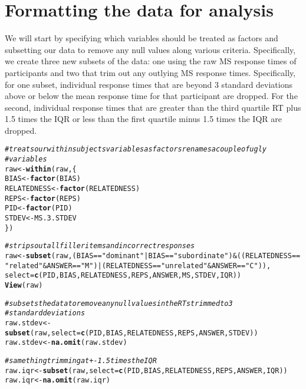 \documentclass[11pt,final] {article}\usepackage[]{graphicx}\usepackage[]{color}
\makeatletter
\newcommand{\hlstr}[1]{\textcolor[rgb]{0.192,0.494,0.8}{#1}}%
\newcommand{\hlcom}[1]{\textcolor[rgb]{0.678,0.584,0.686}{\textit{#1}}}%
\newcommand{\hlopt}[1]{\textcolor[rgb]{0,0,0}{#1}}%
\newcommand{\hlstd}[1]{\textcolor[rgb]{0.345,0.345,0.345}{#1}}%
\newcommand{\hlkwb}[1]{\textcolor[rgb]{0.69,0.353,0.396}{#1}}%
\newcommand{\hlkwc}[1]{\textcolor[rgb]{0.333,0.667,0.333}{#1}}%
\newcommand{\hlkwd}[1]{\textcolor[rgb]{0.737,0.353,0.396}{\textbf{#1}}}%
\newenvironment{kframe}{%
 \def\at@end@of@kframe{}%
 \ifinner\ifhmode%
  \def\at@end@of@kframe{\end{minipage}}%
  \begin{minipage}{\columnwidth}%
 \fi\fi%
 \def\FrameCommand##1{\hskip\@totalleftmargin \hskip-\fboxsep
 \colorbox{shadecolor}{##1}\hskip-\fboxsep
     \hskip-\linewidth \hskip-\@totalleftmargin \hskip\columnwidth}%
 \MakeFramed {\advance\hsize-\width
   \@totalleftmargin\z@ \linewidth\hsize
   \@setminipage}}%
 {\par\unskip\endMakeFramed%
 \at@end@of@kframe}
\newenvironment{knitrout}{}{} %
\makeatother
\begin{document}
\section{Formatting the data for analysis}

We will start by specifying which variables should be treated as factors and subsetting our data to remove any null values along various criteria. Specifically, we create three new subsets of the data: one using the raw MS response times of participants and two that trim out any outlying MS response times. Specifically, for one subset, individual response times that are beyond 3 standard deviations above or below the mean response time for that participant are dropped. For the second, individual response times that are greater than the third quartile RT plus 1.5 times the IQR or less than the first quartile minus 1.5 times the IQR are dropped.

\begin{knitrout}
\color{fgcolor}\begin{kframe}
\begin{alltt}
\hlcom{# treats our within subjects variables as factors renames a couple of ugly}
\hlcom{# variables}
\hlstd{raw} \hlkwb{<-} \hlkwd{within}\hlstd{(raw, \{}
    \hlstd{BIAS} \hlkwb{<-} \hlkwd{factor}\hlstd{(BIAS)}
    \hlstd{RELATEDNESS} \hlkwb{<-} \hlkwd{factor}\hlstd{(RELATEDNESS)}
    \hlstd{REPS} \hlkwb{<-} \hlkwd{factor}\hlstd{(REPS)}
    \hlstd{PID} \hlkwb{<-} \hlkwd{factor}\hlstd{(PID)}
    \hlstd{STDEV} \hlkwb{<-} \hlstd{MS.3.STDEV}
\hlstd{\})}

\hlcom{# strips out all filler items and incorrect responses}
\hlstd{raw} \hlkwb{<-} \hlkwd{subset}\hlstd{(raw, (BIAS} \hlopt{==} \hlstr{"dominant"} \hlopt{|} \hlstd{BIAS} \hlopt{==} \hlstr{"subordinate"}\hlstd{)} \hlopt{&} \hlstd{((RELATEDNESS} \hlopt{==}
    \hlstr{"related"} \hlopt{&} \hlstd{ANSWER} \hlopt{==} \hlstr{"M"}\hlstd{)} \hlopt{|} \hlstd{(RELATEDNESS} \hlopt{==} \hlstr{"unrelated"} \hlopt{&} \hlstd{ANSWER} \hlopt{==} \hlstr{"C"}\hlstd{)),}
    \hlkwc{select} \hlstd{=} \hlkwd{c}\hlstd{(PID, BIAS, RELATEDNESS, REPS, ANSWER, MS, STDEV, IQR))}
\hlkwd{View}\hlstd{(raw)}

\hlcom{# subsets the data to remove any null values in the RTs trimmed to 3}
\hlcom{# standard deviations}
\hlstd{raw.stdev} \hlkwb{<-} \hlkwd{subset}\hlstd{(raw,} \hlkwc{select} \hlstd{=} \hlkwd{c}\hlstd{(PID, BIAS, RELATEDNESS, REPS, ANSWER, STDEV))}
\hlstd{raw.stdev} \hlkwb{<-} \hlkwd{na.omit}\hlstd{(raw.stdev)}

\hlcom{# same thing trimming at +- 1.5 times the IQR}
\hlstd{raw.iqr} \hlkwb{<-} \hlkwd{subset}\hlstd{(raw,} \hlkwc{select} \hlstd{=} \hlkwd{c}\hlstd{(PID, BIAS, RELATEDNESS, REPS, ANSWER, IQR))}
\hlstd{raw.iqr} \hlkwb{<-} \hlkwd{na.omit}\hlstd{(raw.iqr)}
\end{alltt}
\end{kframe}
\end{knitrout}
\end{document}
